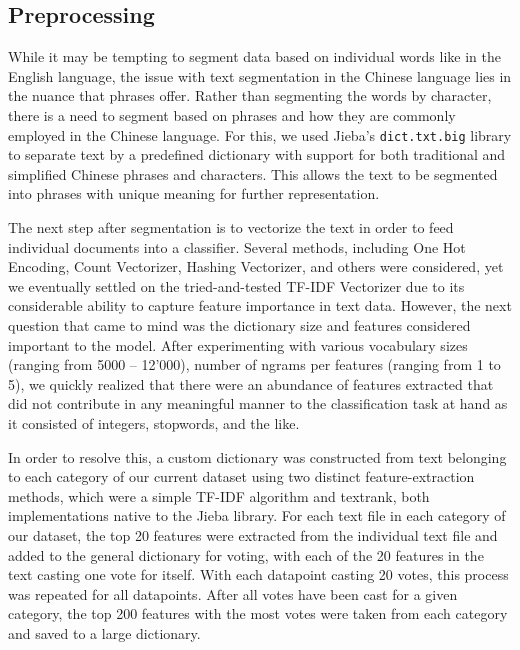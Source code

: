\documentclass[
  titlepage]{article}
\begin{document}
\subsection{Preprocessing}\label{preprocessing}

While it may be tempting to segment data based on individual words like
in the English language, the issue with text segmentation in the Chinese
language lies in the nuance that phrases offer. Rather than segmenting
the words by character, there is a need to segment based on phrases and
how they are commonly employed in the Chinese language. For this, we
used Jieba's \texttt{dict.txt.big} library to separate text by a
predefined dictionary with support for both traditional and simplified
Chinese phrases and characters. This allows the text to be segmented
into phrases with unique meaning for further representation.

The next step after segmentation is to vectorize the text in order to
feed individual documents into a classifier. Several methods, including
One Hot Encoding, Count Vectorizer, Hashing Vectorizer, and others were
considered, yet we eventually settled on the tried-and-tested TF-IDF
Vectorizer due to its considerable ability to capture feature importance
in text data. However, the next question that came to mind was the
dictionary size and features considered important to the model. After
experimenting with various vocabulary sizes (ranging from 5000 --
12'000), number of ngrams per features (ranging from 1 to 5), we quickly
realized that there were an abundance of features extracted that did not
contribute in any meaningful manner to the classification task at hand
as it consisted of integers, stopwords, and the like.

In order to resolve this, a custom dictionary was constructed from text
belonging to each category of our current dataset using two distinct
feature-extraction methods, which were a simple TF-IDF algorithm and
textrank, both implementations native to the Jieba library. For each
text file in each category of our dataset, the top 20 features were
extracted from the individual text file and added to the general
dictionary for voting, with each of the 20 features in the text casting
one vote for itself. With each datapoint casting 20 votes, this process
was repeated for all datapoints. After all votes have been cast for a
given category, the top 200 features with the most votes were taken from
each category and saved to a large dictionary.
\end{document}
